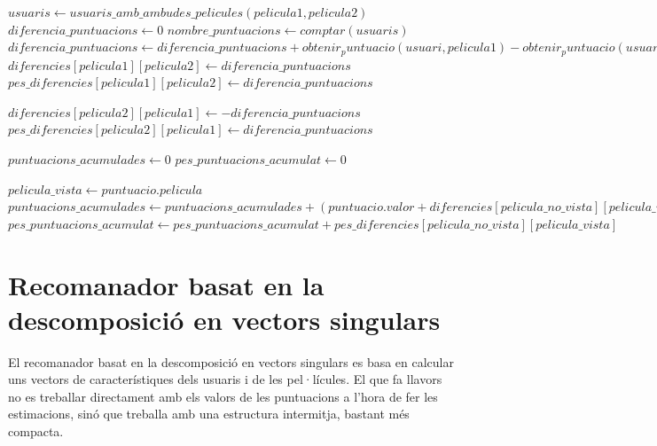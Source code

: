 \begin{algorithm}
\caption{Entrenament del Slope-One}
\label{algorithm-training-slope-one}
\begin{algorithmic}
\State $usuaris \gets usuaris\_amb\_ambudes\_pelicules(pelicula1, pelicula2)$
\State $diferencia\_puntuacions \gets 0$
\State $nombre\_puntuacions \gets comptar(usuaris)$
	\State $diferencia\_puntuacions \gets diferencia\_puntuacions + obtenir_puntuacio(usuari, pelicula1) - obtenir_puntuacio(usuari, pelicula2)$
\EndFor
\State $diferencies[pelicula1][pelicula2] \gets diferencia\_puntuacions$
\State $pes\_diferencies[pelicula1][pelicula2] \gets diferencia\_puntuacions$

\State $diferencies[pelicula2][pelicula1] \gets - diferencia\_puntuacions$
\State $pes\_diferencies[pelicula2][pelicula1] \gets diferencia\_puntuacions$
\end{algorithmic}
\end{algorithm}

\begin{algorithm}
\caption{Recomanació del Slope-One}
\label{algorithm-recommend-slope-one}
\begin{algorithmic}
\State $puntuacions\_acumulades \gets 0$
\State $pes\_puntuacions\_acumulat \gets 0$

	\State $pelicula\_vista \gets puntuacio.pelicula$
	\State $puntuacions\_acumulades \gets puntuacions\_acumulades + (puntuacio.valor + diferencies[pelicula\_no\_vista][pelicula\_vista]) \times pes\_diferencies[pelicula\_no\_vista][pelicula\_vista]$
	\State $pes\_puntuacions\_acumulat \gets pes\_puntuacions\_acumulat + pes\_diferencies[pelicula\_no\_vista][pelicula\_vista]$
\EndFor


\end{algorithmic}
\end{algorithm}

\section{Recomanador basat en la descomposició en vectors singulars}

El recomanador basat en la descomposició en vectors singulars es basa en calcular uns vectors de característiques dels usuaris i de les pel·lícules. El que fa llavors no es treballar directament amb els valors de les puntuacions a l'hora de fer les estimacions, sinó que treballa amb una estructura intermitja, bastant més compacta.

